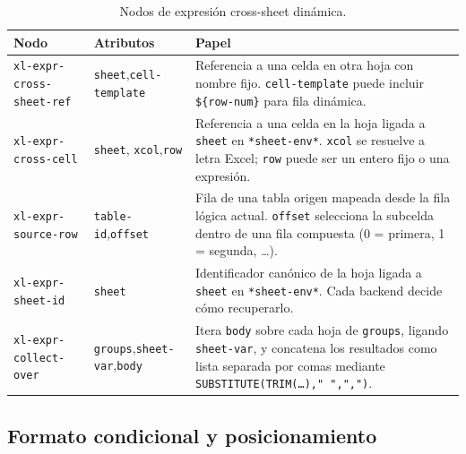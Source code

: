 \documentclass[12pt,a4paper]{report}
\begin{document}
\begin{table}[h!]
\centering
\caption{Nodos de expresi\'on cross-sheet din\'amica.}
\label{tab:ast-cross-sheet}
\renewcommand{\arraystretch}{1.3}
\begin{tabular}{p{3.8cm} p{4.4cm} p{5.6cm}}
\hline
\textbf{Nodo} & \textbf{Atributos} & \textbf{Papel} \\
\hline
\texttt{xl-expr-cross-sheet-ref}
  & \texttt{sheet},\newline\texttt{cell-template}
  & Referencia a una celda en otra hoja con nombre fijo.
    \texttt{cell-template} puede incluir \texttt{\$\{row-num\}} para fila
    din\'amica. \\
\hline
\texttt{xl-expr-cross-cell}
  & \texttt{sheet}, \texttt{xcol},\newline\texttt{row}
  & Referencia a una celda en la hoja ligada a \texttt{sheet} en
    \texttt{*sheet-env*}.  \texttt{xcol} se resuelve a letra Excel;
    \texttt{row} puede ser un entero fijo o una expresi\'on. \\
\hline
\texttt{xl-expr-source-row}
  & \texttt{table-id},\newline\texttt{offset}
  & Fila de una tabla origen mapeada desde la fila l\'ogica actual.
    \texttt{offset} selecciona la subcelda dentro de una fila compuesta
    (0 = primera, 1 = segunda, \ldots). \\
\hline
\texttt{xl-expr-sheet-id}
  & \texttt{sheet}
  & Identificador can\'onico de la hoja ligada a \texttt{sheet} en
    \texttt{*sheet-env*}.  Cada backend decide c\'omo recuperarlo. \\
\hline
\texttt{xl-expr-collect-over}
  & \texttt{groups},\newline\texttt{sheet-var},\newline\texttt{body}
  & Itera \texttt{body} sobre cada hoja de \texttt{groups}, ligando
    \texttt{sheet-var}, y concatena los resultados como lista separada por
    comas mediante \texttt{SUBSTITUTE(TRIM(\ldots)," ",",")}. \\
\hline
\end{tabular}
\end{table}

\subsection{Formato condicional y posicionamiento}
\label{sec:ast-formato}
\end{document}
